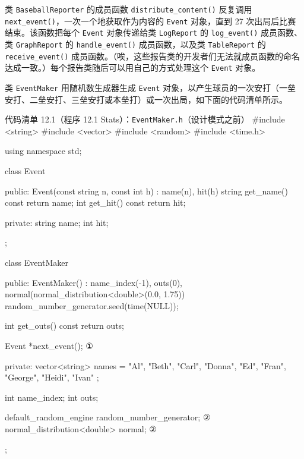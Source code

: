 
类 \texttt{Baseball\allowbreak{}Reporter} 的成员函数 \texttt{distribute\_\allowbreak{}content(\allowbreak{})\allowbreak{}} 反复调用 \texttt{next\_\allowbreak{}event(\allowbreak{})\allowbreak{}}，一次一个地获取作为内容的 \texttt{Event} 对象，直到 27 次出局后比赛结束。该函数把每个 \texttt{Event} 对象传递给类 \texttt{LogReport} 的 \texttt{log\_\allowbreak{}event(\allowbreak{})\allowbreak{}} 成员函数、类 \texttt{Graph\allowbreak{}Report} 的 \texttt{handle\_\allowbreak{}event(\allowbreak{})\allowbreak{}} 成员函数，以及类 \texttt{Table\allowbreak{}Report} 的 \texttt{receive\_\allowbreak{}event(\allowbreak{})\allowbreak{}} 成员函数。（唉，这些报告类的开发者们无法就成员函数的命名达成一致。）每个报告类随后可以用自己的方式处理这个 \texttt{Event} 对象。

类 \texttt{Event\allowbreak{}Maker} 用随机数生成器生成 \texttt{Event} 对象，以产生球员的一次安打（一垒安打、二垒安打、三垒安打或本垒打）或一次出局，如下面的代码清单所示。

\begin{codeboxt}{代码清单 12.1（程序 12.1 Stats）：\texttt{Event\allowbreak{}Maker.\allowbreak{}h}（设计模式之前）}
#include <string>
#include <vector>
#include <random>
#include <time.h>

using namespace std;

class Event
{
public:
    Event(const string n, const int h) : name(n), hit(h) {}
    string get_name() const { return name; }
    int    get_hit()  const { return hit; }

private:
    string name;
    int hit;
};

class EventMaker
{
public:
    EventMaker()
        : name_index(-1), outs(0),
          normal(normal_distribution<double>(0.0, 1.75))
    {
        random_number_generator.seed(time(NULL));
    }

    int get_outs() const { return outs; }

    Event *next_event();                            ①

private:
    vector<string> names = { "Al", "Beth", "Carl", "Donna", "Ed",
                             "Fran", "George", "Heidi", "Ivan" };

    int name_index;
    int outs;

    default_random_engine random_number_generator;  ②
    normal_distribution<double> normal;             ②
};
\end{codeboxt}
\par
{}\par

